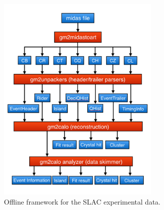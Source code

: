 \begin{figure}[htbp]
\centering
\includegraphics[width=0.7\textwidth]{pics/offline_slac_framework}
\caption{Offline framework for the SLAC experimental data.}
\end{figure}



